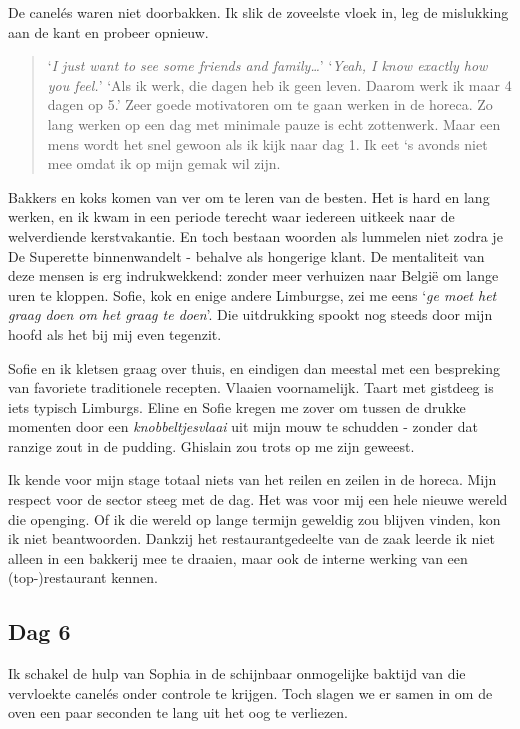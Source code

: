 \documentclass[
  11pt,
  dutch,
]{memoir}
\begin{document}
De canelés waren niet doorbakken. Ik slik de zoveelste vloek in, leg de
mislukking aan de kant en probeer opnieuw.

\begin{quote}
`\emph{I just want to see some friends and family\ldots{}}' `\emph{Yeah,
I know exactly how you feel.}' `Als ik werk, die dagen heb ik geen
leven. Daarom werk ik maar 4 dagen op 5.' Zeer goede motivatoren om te
gaan werken in de horeca. Zo lang werken op een dag met minimale pauze
is echt zottenwerk. Maar een mens wordt het snel gewoon als ik kijk naar
dag 1. Ik eet `s avonds niet mee omdat ik op mijn gemak wil zijn.
\end{quote}

Bakkers en koks komen van ver om te leren van de besten. Het is hard en
lang werken, en ik kwam in een periode terecht waar iedereen uitkeek
naar de welverdiende kerstvakantie. En toch bestaan woorden als lummelen
niet zodra je De Superette binnenwandelt - behalve als hongerige klant.
De mentaliteit van deze mensen is erg indrukwekkend: zonder meer
verhuizen naar België om lange uren te kloppen. Sofie, kok en enige
andere Limburgse, zei me eens `\emph{ge moet het graag doen om het graag
te doen}'. Die uitdrukking spookt nog steeds door mijn hoofd als het bij
mij even tegenzit.

Sofie en ik kletsen graag over thuis, en eindigen dan meestal met een
bespreking van favoriete traditionele recepten. Vlaaien voornamelijk.
Taart met gistdeeg is iets typisch Limburgs. Eline en Sofie kregen me
zover om tussen de drukke momenten door een \emph{knobbeltjesvlaai} uit
mijn mouw te schudden - zonder dat ranzige zout in de pudding. Ghislain
zou trots op me zijn geweest.

Ik kende voor mijn stage totaal niets van het reilen en zeilen in de
horeca. Mijn respect voor de sector steeg met de dag. Het was voor mij
een hele nieuwe wereld die openging. Of ik die wereld op lange termijn
geweldig zou blijven vinden, kon ik niet beantwoorden. Dankzij het
restaurantgedeelte van de zaak leerde ik niet alleen in een bakkerij mee
te draaien, maar ook de interne werking van een (top-)restaurant kennen.

\hypertarget{dag-6}{%
\subsection{Dag 6}\label{dag-6}}

Ik schakel de hulp van Sophia in de schijnbaar onmogelijke baktijd van
die vervloekte canelés onder controle te krijgen. Toch slagen we er
samen in om de oven een paar seconden te lang uit het oog te verliezen.
\end{document}

